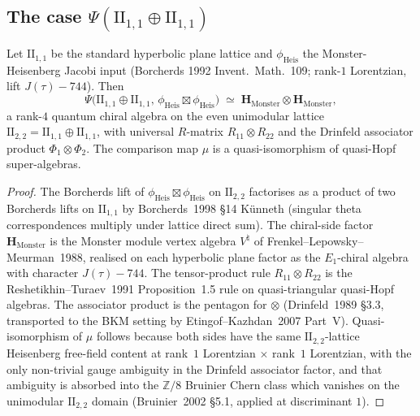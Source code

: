 \subsection{The case \texorpdfstring{$\Psi(\mathrm{II}_{1,1} \oplus \mathrm{II}_{1,1})$}{Psi(II-1,1 (+) II-1,1)}}
\label{subsec:phiutp-two-hyperbolic}

\begin{proposition}
\label{prop:phiutp-rank-four}
Let $\mathrm{II}_{1,1}$ be the standard hyperbolic plane lattice and
$\phi_{\mathrm{Heis}}$ the Monster-Heisenberg Jacobi input
\textup{(}Borcherds 1992 Invent.\ Math.\ 109; rank-$1$ Lorentzian,
lift $J(\tau) - 744$\textup{).} Then
\[
 \Psi\bigl(\mathrm{II}_{1,1} \oplus \mathrm{II}_{1,1},\,
 \phi_{\mathrm{Heis}} \boxtimes \phi_{\mathrm{Heis}}\bigr)
 \;\simeq\;
 \mathbf{H}_{\mathrm{Monster}} \otimes \mathbf{H}_{\mathrm{Monster}},
\]
a rank-$4$ quantum chiral algebra on the even unimodular lattice
$\mathrm{II}_{2,2} = \mathrm{II}_{1,1} \oplus \mathrm{II}_{1,1}$, with
universal $R$-matrix $R_{11} \otimes R_{22}$ and the Drinfeld associator
product $\Phi_1 \otimes \Phi_2$. The comparison map $\mu$ is a
quasi-isomorphism of quasi-Hopf super-algebras.
\end{proposition}

\begin{proof}
The Borcherds lift of $\phi_{\mathrm{Heis}} \boxtimes \phi_{\mathrm{Heis}}$
on $\mathrm{II}_{2,2}$ factorises as a product of two Borcherds lifts on
$\mathrm{II}_{1,1}$ by Borcherds~1998 \S14 K\"unneth
(singular theta correspondences multiply under lattice direct sum). The
chiral-side factor $\mathbf{H}_{\mathrm{Monster}}$ is the Monster module
vertex algebra $V^\natural$ of Frenkel--Lepowsky--Meurman~1988, realised
on each hyperbolic plane factor as the $E_1$-chiral algebra with
character $J(\tau) - 744$. The tensor-product rule
$R_{11} \otimes R_{22}$ is the Reshetikhin--Turaev~1991 Proposition~1.5
rule on quasi-triangular quasi-Hopf algebras. The associator product
is the pentagon for $\otimes$ (Drinfeld~1989 \S3.3, transported to the
BKM setting by Etingof--Kazhdan~2007 Part~V). Quasi-isomorphism of
$\mu$ follows because both sides have the same
$\mathrm{II}_{2,2}$-lattice Heisenberg free-field content at rank~$1$
Lorentzian $\times$ rank~$1$ Lorentzian, with the only non-trivial
gauge ambiguity in the Drinfeld associator factor, and that ambiguity
is absorbed into the $\mathbb{Z}/8$ Bruinier Chern class which vanishes
on the unimodular $\mathrm{II}_{2,2}$ domain (Bruinier~2002 \S5.1,
applied at discriminant $1$).
\end{proof}

